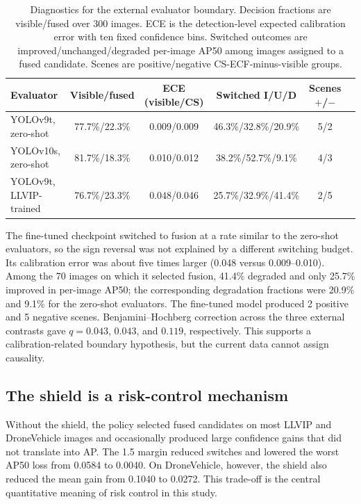 \documentclass[preprint,11pt]{elsarticle}
\begin{document}
\begin{table}[t]
\centering
\scriptsize
\setlength{\tabcolsep}{3pt}
\caption{Diagnostics for the external evaluator boundary. Decision fractions
are visible/fused over 300 images. ECE is the detection-level expected
calibration error with ten fixed confidence bins. Switched outcomes are
improved/unchanged/degraded per-image AP50 among images assigned to a fused
candidate. Scenes are positive/negative CS-ECF-minus-visible groups.}
\label{tab:external-diagnostics}
\begin{tabular}{@{}lccccc@{}}
\toprule
Evaluator & Visible/fused & ECE (visible/CS) &
Switched I/U/D & Scenes \(+\)/\(-\) \\
\midrule
YOLOv9t, zero-shot & 77.7\%/22.3\% & 0.009/0.009 &
46.3\%/32.8\%/20.9\% & 5/2 \\
YOLOv10s, zero-shot & 81.7\%/18.3\% & 0.010/0.012 &
38.2\%/52.7\%/9.1\% & 4/3 \\
YOLOv9t, LLVIP-trained & 76.7\%/23.3\% & 0.048/0.046 &
25.7\%/32.9\%/41.4\% & 2/5 \\
\bottomrule
\end{tabular}
\end{table}

The fine-tuned checkpoint switched to fusion at a rate similar to the
zero-shot evaluators, so the sign reversal was not explained by a different
switching budget. Its calibration error was about five times larger
(0.048 versus 0.009--0.010). Among the 70 images on which it selected fusion,
41.4\% degraded and only 25.7\% improved in per-image AP50; the corresponding
degradation fractions were 20.9\% and 9.1\% for the zero-shot evaluators. The
fine-tuned model produced 2 positive and 5 negative scenes. Benjamini--Hochberg
correction across the three external contrasts gave \(q=0.043\), \(0.043\),
and \(0.119\), respectively. This supports a calibration-related boundary
hypothesis, but the current data cannot assign causality.

\subsection{The shield is a risk-control mechanism}

Without the shield, the policy selected fused candidates on most LLVIP and
DroneVehicle images and occasionally produced large confidence gains that did
not translate into AP. The 1.5 margin reduced switches and lowered the worst
AP50 loss from 0.0584 to 0.0040. On DroneVehicle, however, the shield also
reduced the mean gain from 0.1040 to 0.0272. This trade-off is the central
quantitative meaning of risk control in this study.
\end{document}
